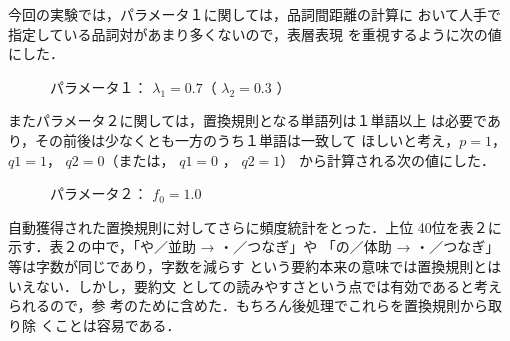 今回の実験では，パラメータ１に関しては，品詞間距離の計算に
おいて人手で指定している品詞対があまり多くないので，表層表現
を重視するように次の値にした．

\begin{flushleft}
　　　{\gt パラメータ１：} $\lambda _1 =0.7$（ $\lambda _2 = 0.3$ ）
\end{flushleft}

またパラメータ２に関しては，置換規則となる単語列は１単語以上
は必要であり，その前後は少なくとも一方のうち１単語は一致して
ほしいと考え，$p = 1$， $q1 = 1$， $q2 = 0$（または， $q1 = 0$ ， $q2 = 1$）
から計算される次の値にした．

\begin{flushleft}
　　　{\gt パラメータ２：} $f_0 = 1.0$
\end{flushleft}

自動獲得された置換規則に対してさらに頻度統計をとった．上位
40位を表２に示す．表２の中で，「や／並助 → ・／つなぎ」や
「の／体助 → ・／つなぎ」等は字数が同じであり，字数を減らす
という要約本来の意味では置換規則とはいえない．しかし，要約文
としての読みやすさという点では有効であると考えられるので，参
考のために含めた．もちろん後処理でこれらを置換規則から取り除
くことは容易である．

